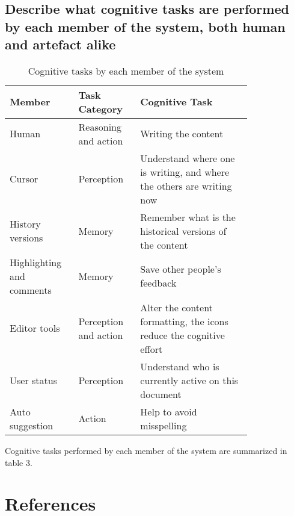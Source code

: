 \documentclass[
	letterpaper, %
]{jdf}
\begin{document}
\subsection{Describe what cognitive tasks are performed by each member of the system, both human and artefact alike}

\begin{table}[h] %
	\caption{Cognitive tasks by each member of the system}
	\small %
	\centering %
	\begin{tabular}{L{0.2\linewidth} L{0.2\linewidth} L{0.4\linewidth}}
		\textbf{Member} & \textbf{Task Category} & \textbf{Cognitive Task}\\
		\toprule[0.5pt]
		Human & Reasoning and action & Writing the content \\
		\midrule
		Cursor & Perception & Understand where one is writing, and where the others are writing now \\
		\midrule
		History versions & Memory & Remember what is the historical versions of the content \\
		\midrule
		Highlighting and comments & Memory & Save other people's feedback \\
		\midrule
		Editor tools & Perception and action & Alter the content formatting, the icons reduce the cognitive effort \\
		\midrule
		User status & Perception & Understand who is currently active on this document \\
		\midrule
		Auto suggestion & Action & Help to avoid misspelling \\
	\end{tabular}
\end{table}

Cognitive tasks performed by each member of the system are summarized in table 3. 

\section{References}
\printbibliography[heading=none]
\end{document}
